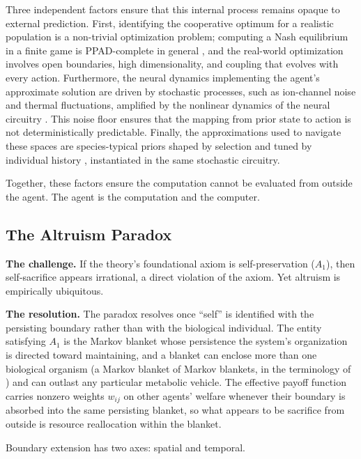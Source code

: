 \documentclass[11pt]{article}
\theoremstyle{plain}
\theoremstyle{definition}
\theoremstyle{remark}
\let\origsubsection\subsection
\renewcommand{\subsection}{\needspace{7\baselineskip}\origsubsection}
\begin{document}
Three independent factors ensure that this internal process remains
opaque to external prediction. First, identifying the cooperative
optimum for a realistic population is a non-trivial optimization
problem; computing a Nash equilibrium in a finite game is PPAD-complete
in general \citep{Daskalakis2009}, and the real-world optimization
involves open boundaries, high dimensionality, and coupling that evolves
with every action. Furthermore, the neural dynamics implementing the
agent's approximate solution are driven by stochastic processes, such as
ion-channel noise and thermal fluctuations, amplified by the nonlinear
dynamics of the neural circuitry \citep{FaiSelWol2008}. This noise floor
ensures that the mapping from prior state to action is not
deterministically predictable. Finally, the approximations used to
navigate these spaces are species-typical priors shaped by selection and
tuned by individual history
\citep{CosmidesTooby1992, CosmidesTooby2013}, instantiated in the same
stochastic circuitry.

Together, these factors ensure the computation cannot be evaluated from
outside the agent. The agent is the computation and the computer.

\subsection{The Altruism Paradox}\label{the-altruism-paradox}

\textbf{The challenge.} If the theory's foundational axiom is
self-preservation (\(A_1\)), then self-sacrifice appears irrational, a
direct violation of the axiom. Yet altruism is empirically ubiquitous.

\textbf{The resolution.} The paradox resolves once ``self'' is
identified with the persisting boundary rather than with the biological
individual. The entity satisfying \(A_1\) is the Markov blanket
\citep{Pearl2000, KirchhoffFriston2018} whose persistence the system's
organization is directed toward maintaining, and a blanket can enclose
more than one biological organism (a Markov blanket of Markov blankets,
in the terminology of \citep{KirchhoffFriston2018}) and can outlast any
particular metabolic vehicle. The effective payoff function carries
nonzero weights \(w_{ij}\) on other agents' welfare whenever their
boundary is absorbed into the same persisting blanket, so what appears
to be sacrifice from outside is resource reallocation within the
blanket.

Boundary extension has two axes: spatial and temporal.
\end{document}

